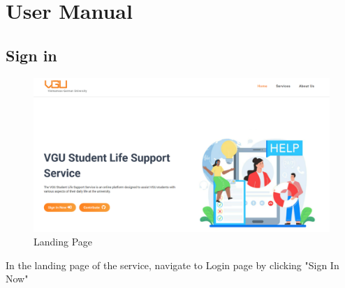 \section{User Manual}

\subsection{Sign in}
\begin{figure}[H]
	\centering
	\includegraphics[width=1.\linewidth]{graphics/gui/user/landing}
	\caption{Landing Page}
	\label{fig:landing}
\end{figure}

In the landing page of the service, navigate to Login page by clicking "Sign In Now"


